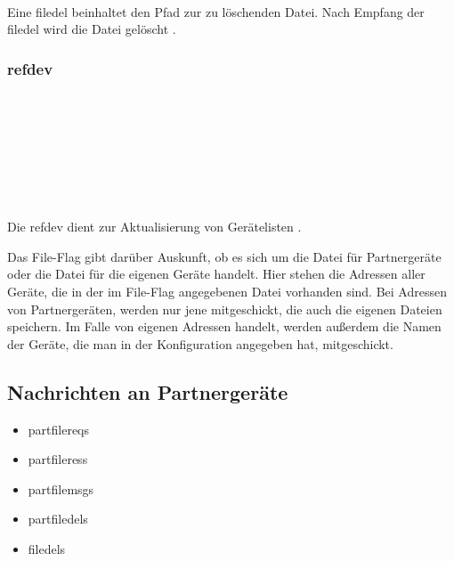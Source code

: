 	\begin{rightwordgroup}{\isprotomsgtype}
	\end{rightwordgroup} \\
	
	\begin{rightwordgroup}{\isprotomsgdata}
		 \\
		\skippedwords \\
	\end{rightwordgroup}
	
Eine \gls{filedel} beinhaltet den Pfad zur zu löschenden Datei. Nach Empfang der \gls{filedel} wird die Datei gelöscht .

\subsubsection{\gls{refdev}}
\messagestart
	 \\
	
	\begin{rightwordgroup}{\isprotomsgtype}
	\end{rightwordgroup} \\
	
	\begin{rightwordgroup}{\isprotomsgdata}
		 \\
		 \\
		\skippedwords \\
	\end{rightwordgroup} 
	
Die \gls{refdev} dient zur Aktualisierung von Gerätelisten .
\begin{description}
	Das File-Flag gibt darüber Auskunft, ob es sich um die Datei für Partnergeräte oder die Datei für die eigenen Geräte handelt.
	Hier stehen die Adressen aller Geräte, die in der im File-Flag angegebenen Datei vorhanden sind. Bei Adressen von Partnergeräten, werden nur jene mitgeschickt, die auch die eigenen Dateien speichern. Im Falle von eigenen Adressen handelt, werden außerdem die Namen der Geräte, die man in der Konfiguration angegeben hat, mitgeschickt.
\end{description}

\subsection{Nachrichten an Partnergeräte}
\begin{itemize}
	\item \gls{partfilereq}s
	\item \gls{partfileres}s
	\item \gls{partfilemsg}s
	\item \gls{partfiledel}s
	\item \gls{filedel}s
\end{itemize}

